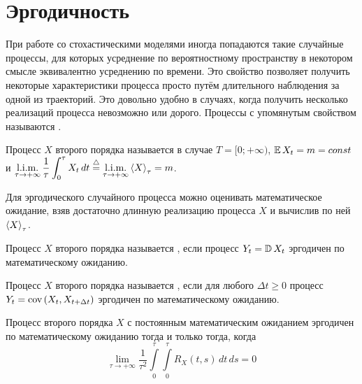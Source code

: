 \section{Эргодичность} \label{section:ergodicity}

При работе со стохастическими моделями иногда попадаются такие случайные процессы,
для которых усреднение по вероятностному пространству в некотором смысле эквивалентно усреднению по времени.
Это свойство позволяет получить некоторые характеристики процесса просто путём длительного наблюдения за одной из траекторий.
Это довольно удобно в случаях, когда получить несколько реализаций процесса невозможно или дорого.
Процессы с упомянутым свойством называются .

\begin{definition}
    \label{definition:egrodicity:ergodicity}
    Процесс $ X $ второго порядка называется  в случае $ T = [0; +\infty) $, $ \operatorname{\mathbb{E}} X_t = m = const $ и
    $ \displaystyle \operatorname*{\textnormal{l.i.m.}}_{\tau \to +\infty} \frac{1}{\tau} \int_0^\tau X_t \, dt \overset{\triangle}{=} \operatorname*{\textnormal{l.i.m.}}_{\tau \to +\infty} \left\langle X \right\rangle_\tau = m $.
\end{definition}

Для эргодического случайного процесса можно оценивать математическое ожидание,
взяв достаточно длинную реализацию процесса $ X $ и вычислив по ней $ \left\langle X \right\rangle_\tau $.

\begin{definition}
    \label{definition:egrodicity:ergodicity_dispersion}
    Процесс $ X $ второго порядка называется ,
    если процесс $ Y_t = \operatorname{\mathbb{D}} X_t $ эргодичен по математическому ожиданию.
\end{definition}

\begin{definition}
    \label{definition:egrodicity:ergodicity_correlation}
    Процесс $ X $ второго порядка называется ,
    если для любого $ \Delta t \geqslant 0 $ процесс $ Y_t = \textnormal{cov}\left(X_t, X_{t + \Delta t}\right) $ эргодичен по математическому ожиданию.
\end{definition}

\begin{theorem}
    \label{theorem:ergodicity:ergodicity_test}
    Процесс второго порядка $ X $ с постоянным математическим ожиданием эргодичен по математическому ожиданию тогда и только тогда, когда
    \[
        \lim_{\tau \to +\infty} \frac{1}{\tau^2} \int\limits_0^\tau \int\limits_0^\tau R_X(t, s) \, dt \, ds = 0
    \]
\end{theorem}


